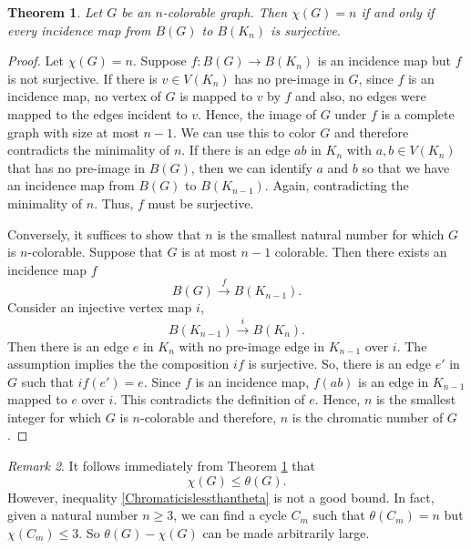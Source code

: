 \documentclass{amsart}
\newtheorem{theorem}{Theorem}[section]
\theoremstyle{definition}
\theoremstyle{remark}
\newtheorem{remark}[theorem]{Remark}
\numberwithin{equation}{section}
\begin{document}
	\begin{theorem}
		\label{ColoringintermsofVertexMaps}
		Let \(G\) be an \(n\)-colorable graph. Then \(\chi(G) = n\) if and only if every incidence map from \(B(G)\) to \(B(K_n)\) is surjective.
	\end{theorem}
	\begin{proof}
		Let \(\chi(G) = n\). Suppose \(f:B(G) \rightarrow B(K_n)\) is an incidence map but \(f\) is not surjective. If there is \(v \in V(K_n)\) has no pre-image in \(G\), since \(f\) is an incidence map, no vertex of \(G\) is mapped to \(v\) by \(f\) and also, no edges were mapped to the edges incident to \(v\). Hence, the image of \(G\) under \(f\) is a complete graph with size at most \(n-1\). We can use this to color \(G\) and therefore contradicts the minimality of \(n\). If there is an edge \(ab\) in \(K_n\) with \(a,b \in V(K_n)\) that has no pre-image in \(B(G)\), then we can identify \(a\) and \(b\) so that we have an incidence map from \(B(G)\) to \(B(K_{n-1})\). Again, contradicting the minimality of \(n\). Thus, \(f\) must be surjective.
		
		Conversely, it suffices to show that \(n\) is the smallest natural number for which \(G\) is \(n\)-colorable. Suppose that \(G\) is at most \(n-1\) colorable. Then there exists an incidence map \(f\)
		\[B(G) \overset{f}{\rightarrow} B(K_{n-1}).\]
		Consider an injective vertex map \(i\),
		\[B(K_{n-1}) \overset{i}{\rightarrow}B(K_n).\]
		Then there is an edge \(e\) in \(K_n\) with no pre-image edge in \(K_{n-1}\) over \(i\). The assumption implies the the composition \(i f\) is surjective. So, there is an edge \(e'\) in \(G\) such that \(i f (e') = e\). Since \(f\) is an incidence map, \(f(ab)\) is an edge in \(K_{n-1}\) mapped to \(e\) over \(i\). This contradicts the definition of \(e\). Hence, \(n\) is the smallest integer for which \(G\) is \(n\)-colorable and therefore, \(n\) is the chromatic number of \(G\).
	\end{proof}
	
	\begin{remark}
		It follows immediately from Theorem \ref{ColoringintermsofVertexMaps} that
		\begin{equation}
			\label{Chromaticislessthantheta}
			\chi(G) \leq \theta(G).
		\end{equation}
		However, inequality \eqref{Chromaticislessthantheta} is not a good bound. In fact, given a natural number \(n \geq 3\), we can find a cycle \(C_m\) such that \(\theta (C_m) = n\) but \(\chi(C_m) \leq 3\). So \(\theta(G) - \chi(G)\) can be made arbitrarily large.
	\end{remark}
	
\end{document}
